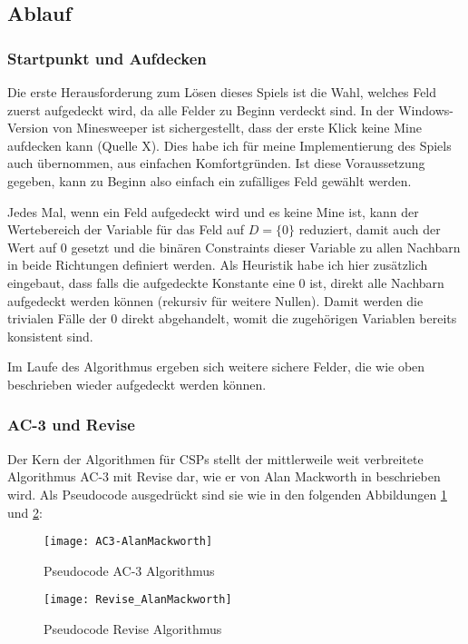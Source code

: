 \subsection{Ablauf}
\subsubsection{Startpunkt und Aufdecken}

Die erste Herausforderung zum Lösen dieses Spiels ist die Wahl, welches Feld zuerst aufgedeckt wird, da alle Felder zu Beginn verdeckt sind.
In der Windows-Version von Minesweeper ist sichergestellt, dass der erste Klick keine Mine aufdecken kann (Quelle X). Dies habe ich für 
meine Implementierung des Spiels auch übernommen, aus einfachen Komfortgründen. Ist diese Voraussetzung gegeben, kann zu Beginn also einfach
ein zufälliges Feld gewählt werden.

Jedes Mal, wenn ein Feld aufgedeckt wird und es keine Mine ist, kann der Wertebereich der Variable für
das Feld auf $D=\{0\}$ reduziert, damit auch der Wert auf 0 gesetzt und die binären Constraints dieser Variable zu allen Nachbarn in beide
Richtungen definiert werden. Als Heuristik habe ich hier zusätzlich eingebaut, dass falls die aufgedeckte Konstante eine 0 ist, direkt
alle Nachbarn aufgedeckt werden können (rekursiv für weitere Nullen). Damit werden die trivialen Fälle der 0 direkt abgehandelt, womit
die zugehörigen Variablen bereits konsistent sind.

Im Laufe des Algorithmus ergeben sich weitere sichere Felder, die wie oben beschrieben wieder aufgedeckt werden können.

\subsubsection{AC-3 und Revise}

Der Kern der Algorithmen für CSPs stellt der mittlerweile weit verbreitete Algorithmus AC-3 mit Revise dar, wie er von Alan Mackworth in 
\cite{Alan} beschrieben wird. Als Pseudocode ausgedrückt sind sie wie in den folgenden Abbildungen \ref{AC3} und \ref{Revise}:

\begin{figure}[!htb]
    \centering
    \texttt{[image: AC3-AlanMackworth]}
    \caption{Pseudocode AC-3 Algorithmus}\label{AC3}
\end{figure}
\begin{figure}[!htb]
    \centering
    \texttt{[image: Revise\_AlanMackworth]}
    \caption{Pseudocode Revise Algorithmus}\label{Revise}
\end{figure}

